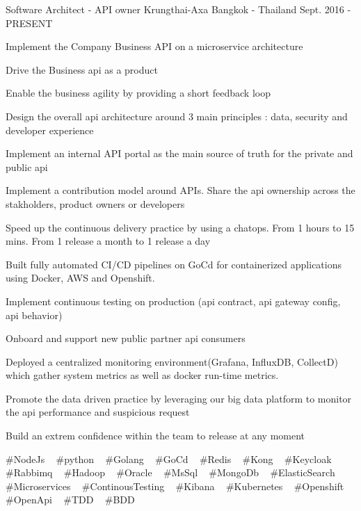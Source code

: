

\begin{cventries}

  \cventry
    {Software Architect - API owner} %
    {Krungthai-Axa} %
    {Bangkok - Thailand} %
    {Sept. 2016 - PRESENT} %
    {
      \begin{cvitems} %
        \item {Implement the Company Business API on a microservice architecture}
        \item {Drive the Business api as a product}
        \item {Enable the business agility by providing a short feedback loop}
        \item {Design the overall api architecture around 3 main principles : data, security and developer experience}
        \item {Implement an internal API portal as the main source of truth for the private and public api}
        \item {Implement a contribution model around APIs. Share the api ownership across the stakholders, product owners or developers}
        \item {Speed up the continuous delivery practice by using a chatops. From 1 hours to 15 mins. From 1 release a month to 1 release a day}
        \item {Built fully automated CI/CD pipelines on GoCd for containerized applications using Docker, AWS and Openshift.}
        \item {Implement continuous testing on production (api contract, api gateway config, api behavior)}
        \item {Onboard and support new public partner api consumers}
        \item {Deployed a centralized monitoring environment(Grafana, InfluxDB, CollectD) which gather system metrics as well as docker run-time metrics.}
        \item {Promote the data driven practice by leveraging our big data platform to monitor the api performance and suspicious request}
        \item {Build an extrem confidence within the team to release at any moment}
      \end{cvitems}
    }
    {
      \#NodeJs ~
      \#python ~
      \#Golang ~
      \#GoCd ~
      \#Redis ~
      \#Kong ~
      \#Keycloak ~
      \#Rabbimq ~
      \#Hadoop ~
      \#Oracle ~
      \#MsSql ~
      \#MongoDb ~
      \#ElasticSearch ~
      \#Microservices ~
      \#ContinousTesting ~
      \#Kibana ~
      \#Kubernetes ~
      \#Openshift ~
      \#OpenApi ~
      \#TDD ~
      \#BDD
    }


\end{cventries}
